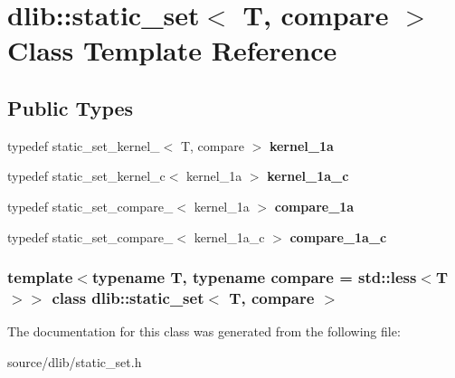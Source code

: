 \hypertarget{classdlib_1_1static__set}{
\section{dlib::static\_\-set$<$ T, compare $>$ Class Template Reference}
\label{classdlib_1_1static__set}
}
\subsection*{Public Types}
\begin{DoxyCompactItemize}
\item 
\hypertarget{classdlib_1_1static__set_a95164c6fadb87feacadfb32f9c2ece36}{
typedef static\_\-set\_\-kernel\_$<$ T, compare $>$ {\bfseries kernel\_\-1a}}
\label{classdlib_1_1static__set_a95164c6fadb87feacadfb32f9c2ece36}

\item 
\hypertarget{classdlib_1_1static__set_afee096146ede621d027a345652a3a0c1}{
typedef static\_\-set\_\-kernel\_\-c$<$ kernel\_\-1a $>$ {\bfseries kernel\_\-1a\_\-c}}
\label{classdlib_1_1static__set_afee096146ede621d027a345652a3a0c1}

\item 
\hypertarget{classdlib_1_1static__set_a285e563d8bd679dbb03f7a382d5405c0}{
typedef static\_\-set\_\-compare\_$<$ kernel\_\-1a $>$ {\bfseries compare\_\-1a}}
\label{classdlib_1_1static__set_a285e563d8bd679dbb03f7a382d5405c0}

\item 
\hypertarget{classdlib_1_1static__set_a72cb14f4eba83913acd9694613ba355d}{
typedef static\_\-set\_\-compare\_$<$ kernel\_\-1a\_\-c $>$ {\bfseries compare\_\-1a\_\-c}}
\label{classdlib_1_1static__set_a72cb14f4eba83913acd9694613ba355d}

\end{DoxyCompactItemize}
\subsubsection*{template$<$typename T, typename compare = std::less$<$T$>$$>$ class dlib::static\_\-set$<$ T, compare $>$}



The documentation for this class was generated from the following file:\begin{DoxyCompactItemize}
\item 
source/dlib/static\_\-set.h\end{DoxyCompactItemize}
